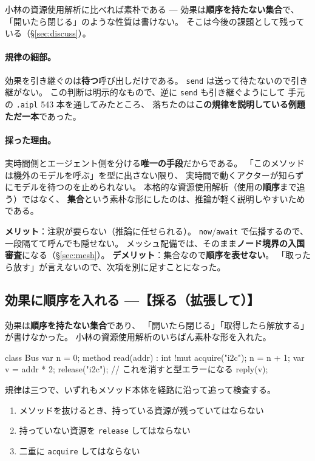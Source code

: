 \documentclass[11pt,a4paper]{ltjsarticle}
\theoremstyle{definition}
\theoremstyle{remark}
\begin{document}
小林の資源使用解析に比べれば素朴である --- 効果は\textbf{順序を持たない集合}で、
「開いたら閉じる」のような性質は書けない。
そこは今後の課題として残っている（\S\ref{sec:discuss}）。

\paragraph{規律の細部。}
効果を引き継ぐのは\textbf{待つ}呼び出しだけである。
\texttt{send} は送って待たないので引き継がない。
この判断は明示的なもので、逆に \texttt{send} も引き継ぐようにして
手元の \texttt{.aipl} 543 本を通してみたところ、
落ちたのは\textbf{この規律を説明している例題ただ一本}であった。

\paragraph{採った理由。}
実時間側とエージェント側を分ける\textbf{唯一の手段}だからである。
「このメソッドは機外のモデルを呼ぶ」を型に出さない限り、
実時間で動くアクターが知らずにモデルを待つのを止められない。
本格的な資源使用解析（使用の\textbf{順序}まで追う）ではなく、
\textbf{集合}という素朴な形にしたのは、推論が軽く説明しやすいためである。

\textbf{メリット}：注釈が要らない（推論に任せられる）。
\texttt{now}/\texttt{await} で伝播するので、一段隔てて呼んでも隠せない。
メッシュ配備では、そのまま\textbf{ノード境界の入国審査}になる（\S\ref{sec:mesh}）。
\textbf{デメリット}：集合なので\textbf{順序を表せない}。
「取ったら放す」が言えないので、次項を別に足すことになった。

\subsection{効果に順序を入れる ---【採る（拡張して）】}

\label{sec:res}

効果は\textbf{順序を持たない集合}であり、
「開いたら閉じる」「取得したら解放する」が書けなかった。
小林の資源使用解析のいちばん素朴な形を入れた。

\begin{aipl}
class Bus {
  var n = 0;
  method read(addr) : int !{mut} {
    acquire("i2c");
    n = n + 1;
    var v = addr * 2;
    release("i2c");           // これを消すと型エラーになる
    reply(v);
  }
}
\end{aipl}

規律は三つで、いずれもメソッド本体を経路に沿って追って検査する。

\begin{enumerate}
\item メソッドを抜けるとき、持っている資源が残っていてはならない
\item 持っていない資源を \texttt{release} してはならない
\item 二重に \texttt{acquire} してはならない
\end{enumerate}
\end{document}
